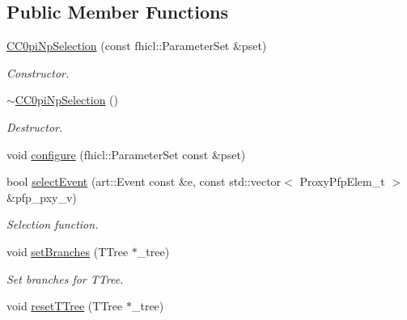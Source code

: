 \subsection*{Public Member Functions}
\begin{DoxyCompactItemize}
\item 
\hyperlink{classselection_1_1CC0piNpSelection_a5770519e6639db45cb9f3a4b1bf3efc2}{C\-C0pi\-Np\-Selection} (const fhicl\-::\-Parameter\-Set \&pset)
\begin{DoxyCompactList}\small\item\em Constructor. \end{DoxyCompactList}\item 
\hypertarget{classselection_1_1CC0piNpSelection_a7f809f358e84885ae2f08f54b4b8183b}{\hyperlink{classselection_1_1CC0piNpSelection_a7f809f358e84885ae2f08f54b4b8183b}{$\sim$\-C\-C0pi\-Np\-Selection} ()}\label{classselection_1_1CC0piNpSelection_a7f809f358e84885ae2f08f54b4b8183b}

\begin{DoxyCompactList}\small\item\em Destructor. \end{DoxyCompactList}\item 
void \hyperlink{classselection_1_1CC0piNpSelection_ace78372ffb6d92911f79ded647aacf4c}{configure} (fhicl\-::\-Parameter\-Set const \&pset)
\item 
bool \hyperlink{classselection_1_1CC0piNpSelection_aee88d296a2ebad59acadfd919139d96f}{select\-Event} (art\-::\-Event const \&e, const std\-::vector$<$ Proxy\-Pfp\-Elem\-\_\-t $>$ \&pfp\-\_\-pxy\-\_\-v)
\begin{DoxyCompactList}\small\item\em Selection function. \end{DoxyCompactList}\item 
\hypertarget{classselection_1_1CC0piNpSelection_a6a14e4d0ff713ed2c75055019d278422}{void \hyperlink{classselection_1_1CC0piNpSelection_a6a14e4d0ff713ed2c75055019d278422}{set\-Branches} (T\-Tree $\ast$\-\_\-tree)}\label{classselection_1_1CC0piNpSelection_a6a14e4d0ff713ed2c75055019d278422}

\begin{DoxyCompactList}\small\item\em Set branches for T\-Tree. \end{DoxyCompactList}\item 
\hypertarget{classselection_1_1CC0piNpSelection_a3d7a6aa0fbd41f4a77390a160ee64e35}{void \hyperlink{classselection_1_1CC0piNpSelection_a3d7a6aa0fbd41f4a77390a160ee64e35}{reset\-T\-Tree} (T\-Tree $\ast$\-\_\-tree)}\label{classselection_1_1CC0piNpSelection_a3d7a6aa0fbd41f4a77390a160ee64e35}


\end{DoxyCompactItemize}
